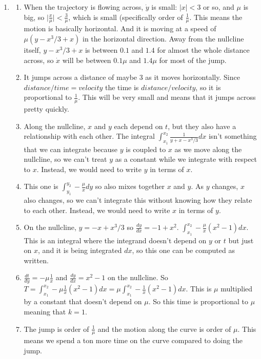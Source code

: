 \documentclass[12pt,letterpaper,noanswers]{exam}
\begin{document}
\begin{enumerate}
\item
\begin{enumerate}
\item When the trajectory is flowing across, $\dot{y}$ is small: $\vert x \vert < 3$ or so, and $\mu$ is big, so $\vert \frac{x}{\mu} \vert < \frac{3}{\mu}$, which is small
(specifically order of $\frac{1}{\mu}$.  
This means the motion is basically horizontal.  And it is moving at a speed of $\mu (y-x^3/3 + x)$ in the horizontal direction.
Away from the nullcline itself, $y-x^3/3 + x$ is between $0.1$ and $1.4$ for almost the whole distance across, so $\dot x$ will be between $0.1\mu$ and $1.4\mu$ for most of the jump.
\item It jumps across a distance of maybe $3$ as it
moves horizontally.
Since $distance/time = velocity$ the time is $distance/velocity$, so it is proportional to $\frac{1}{\mu}$.  This will be very small and means that it jumps across pretty quickly.
\item Along the nullcline, $x$ and $y$ each depend on $t$, but they also have a relationship with each other.  The integral $\int_{x_1}^{x_2} \frac{1}{y+x-x^3/3}dx$ isn't something that we can integrate because $y$ is coupled to $x$ as we move along the nullcline, so we can't treat $y$ as a constant while we integrate with respect to $x$.  Instead, we would need to write $y$ in terms of $x$.
\item This one is $\int_{y_1}^{y_2} -\frac{\mu}{x}dy$ so also mixes together $x$ and $y$.  As $y$ changes, $x$ also changes, so we can't integrate this without knowing how they relate to each other.  Instead, we would need to write $x$ in terms of $y$.
\item On the nullcline, $y = -x+x^3/3$ so $\frac{dy}{dx} = -1 + x^2$.  $\displaystyle \int_{x_1}^{x_2} -\frac{\mu}{x}(x^2-1)dx$.  This is an integral where the integrand doesn't depend on $y$ or $t$ but just on $x$, and it is being integrated $dx$, so this one can be computed as written.
\item $\frac{dt}{dy} = -\mu\frac{1}{x}$ and $\frac{dy}{dx} = x^2 - 1$ on the nullcline.  So $\displaystyle T = \int_{x_1}^{x_2} -\mu \frac{1}{x}(x^2-1) dx = \mu\int_{x_1}^{x_2} - \frac{1}{x}(x^2-1) dx.$
This is $\mu$ multiplied by a constant that doesn't depend on $\mu$.  So this time is proportional to $\mu$ meaning that $k = 1$.
\item The jump is order of $\frac{1}{\mu}$ and the motion along the curve is order of $\mu$.  This means we spend a ton more time on the 
curve compared to doing the jump.
\end{enumerate}


\end{enumerate}
\end{document}
